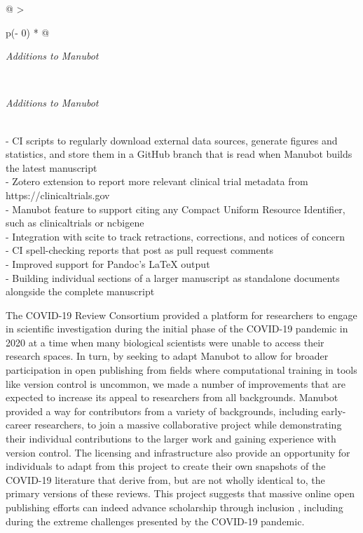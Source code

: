 \documentclass[twocolumn]{ceurart}
\begin{document}
\begin{longtable}[]{@{}
  >{\raggedright\arraybackslash}p{(\columnwidth - 0\tabcolsep) * }@{}}
\caption{List of extensions added to Manubot's functionalities for the COVID-19 Collaborative Review.
\label{tbl:manubot-addons}}\tabularnewline
\toprule
\begin{minipage}[b]{\linewidth}\raggedright
\emph{Additions to Manubot}
\end{minipage} \\
\midrule
\endfirsthead
\toprule
\begin{minipage}[b]{\linewidth}\raggedright
\emph{Additions to Manubot}
\end{minipage} \\
\midrule
\endhead
- CI scripts to regularly download external data sources, generate figures and statistics, and store them in a GitHub branch that is read when Manubot builds the latest manuscript \\
- Zotero extension to report more relevant clinical trial metadata from https://clinicaltrials.gov \\
- Manubot feature to support citing any Compact Uniform Resource Identifier, such as clinicaltrials or ncbigene \\
- Integration with scite to track retractions, corrections, and notices of concern \\
- CI spell-checking reports that post as pull request comments \\
- Improved support for Pandoc's LaTeX output \\
- Building individual sections of a larger manuscript as standalone documents alongside the complete manuscript \\
\bottomrule
\end{longtable}

The COVID-19 Review Consortium provided a platform for researchers to engage in scientific investigation during the initial phase of the COVID-19 pandemic in 2020 at a time when many biological scientists were unable to access their research spaces.
In turn, by seeking to adapt Manubot to allow for broader participation in open publishing from fields where computational training in tools like version control is uncommon, we made a number of improvements that are expected to increase its appeal to researchers from all backgrounds.
Manubot provided a way for contributors from a variety of backgrounds, including early-career researchers, to join a massive collaborative project while demonstrating their individual contributions to the larger work and gaining experience with version control.
The licensing and infrastructure also provide an opportunity for individuals to adapt from this project to create their own snapshots of the COVID-19 literature that derive from, but are not wholly identical to, the primary versions of these reviews.
This project suggests that massive online open publishing efforts can indeed advance scholarship through inclusion \citep{PoDz2q0A}, including during the extreme challenges presented by the COVID-19 pandemic.
\end{document}

